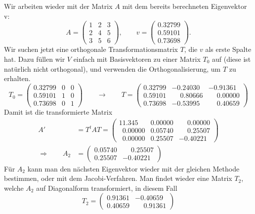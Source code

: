 \begin{beispiel}
Wir arbeiten wieder mit der Matrix $A$ mit dem bereits berechneten
Eigenvektor v:
\[
A=\begin{pmatrix}
1&2&3\\
2&4&5\\
3&5&6
\end{pmatrix}
,\qquad
v=\begin{pmatrix}
   0.32799\\
   0.59101\\
   0.73698
\end{pmatrix}.
\]
Wir suchen jetzt eine orthogonale Transformationsmatrix $T$, die $v$
als erste Spalte hat.
Dazu füllen wir $V$ einfach mit Basisvektoren
zu einer Matrix $T_0$ auf (diese ist natürlich nicht orthogonal),
und verwenden die Orthogonalisierung, um $T$ zu erhalten.
\[
T_0=\begin{pmatrix}
   0.32799&0&0\\
   0.59101&1&0\\
   0.73698&0&1
\end{pmatrix}
\qquad\rightarrow\qquad
T=
\begin{pmatrix}
   0.32799 &-0.24030& -0.91361\\
   0.59101 &\phantom{-} 0.80666&  \phantom{-}0.00000\\
   0.73698 &-0.53995&  \phantom{-}0.40659
\end{pmatrix}
\]
Damit ist die transformierte Matrix 
\begin{align*}
A'&=T^tAT=\begin{pmatrix}
   11.345              &0.00000 & \phantom{-}0.00000\\
   \phantom{0}0.00000  &0.05740 & \phantom{-}0.25507\\
   \phantom{0}0.00000  &0.25507 &-0.40221
\end{pmatrix}
\\
\Rightarrow\qquad
A_2&=
\begin{pmatrix}
   0.05740 & \phantom{-}0.25507\\
   0.25507 &-0.40221
\end{pmatrix}
\end{align*}
Für $A_2$ kann man den nächsten Eigenvektor wieder mit der
gleichen Methode bestimmen, oder mit dem Jacobi-Verfahren.
Man findet wieder eine Matrix $T_2$, welche $A_2$ auf Diagonalform
transformiert, in diesem Fall
\[
T_2=\begin{pmatrix}
   0.91361&          -0.40659\\
   0.40659&\phantom{-}0.91361

\end{pmatrix}\]
\end{beispiel}
